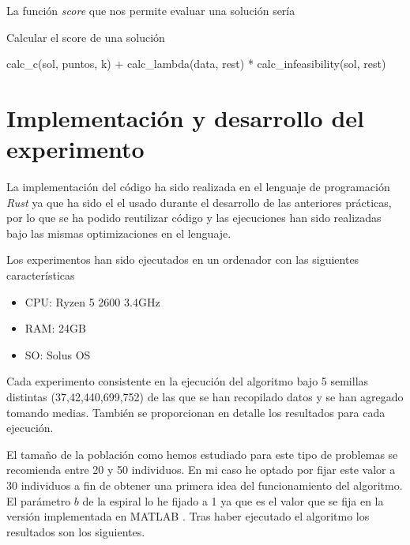 \documentclass[11pt]{article}
\begin{document}
  
  La función \textit{score} que nos permite evaluar una
  solución sería
  
  \begin{algorithm}[H]
  \caption{Calcular el score de una solución}
  \label{score}
  \begin{algorithmic}[1]
    \State \Return calc\_c(sol, puntos, k) + calc\_lambda(data, rest) * calc\_infeasibility(sol, rest)
    \EndProcedure
  \end{algorithmic}
  \end{algorithm}

\section{Implementación y desarrollo del experimento}

La implementación del código ha sido realizada en el lenguaje de programación
\textit{Rust} ya que ha sido el el usado durante el desarrollo de las anteriores
prácticas, por lo que se ha podido reutilizar código y las ejecuciones han sido
realizadas bajo las mismas optimizaciones en el lenguaje.

Los experimentos han sido ejecutados en un ordenador con las siguientes
características

\begin{itemize}
  \item CPU: Ryzen 5 2600 3.4GHz
  \item RAM: 24GB
  \item SO: Solus OS
\end{itemize}

Cada experimento consistente en la ejecución del algoritmo bajo 5 semillas
distintas (37,42,440,699,752) de las que se han recopilado datos y se han
agregado tomando medias. También se proporcionan en detalle los resultados para
cada ejecución.

El tamaño de la población como hemos estudiado para este tipo de problemas se
recomienda entre 20 y 50 individuos. En mi caso he optado por fijar este valor a
30 individuos a fin de obtener una primera idea del funcionamiento del
algoritmo. El parámetro $b$ de la espiral lo he fijado a 1 ya que es el valor
que se fija en la versión implementada en MATLAB \cite{matlab}. Tras haber
ejecutado el algoritmo los resultados son los siguientes.



\end{document}
